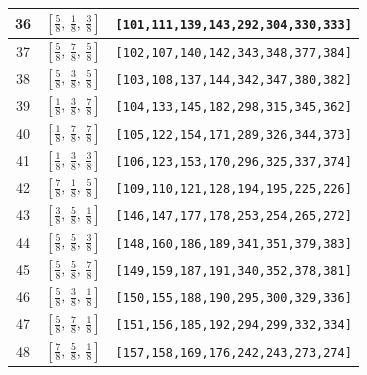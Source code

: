 \documentclass[fleqn,8pt]{jsarticle}
\begin{document}
\begin{longtable}{ccc}
36 & $\left[ \frac{5}{8},\, \frac{1}{8},\, \frac{3}{8} \right]$ & {\tt [101,111,139,143,292,304,330,333]} \\ \hline
37 & $\left[ \frac{5}{8},\, \frac{7}{8},\, \frac{5}{8} \right]$ & {\tt [102,107,140,142,343,348,377,384]} \\ \hline
38 & $\left[ \frac{5}{8},\, \frac{3}{8},\, \frac{5}{8} \right]$ & {\tt [103,108,137,144,342,347,380,382]} \\ \hline
39 & $\left[ \frac{1}{8},\, \frac{3}{8},\, \frac{7}{8} \right]$ & {\tt [104,133,145,182,298,315,345,362]} \\ \hline
40 & $\left[ \frac{1}{8},\, \frac{7}{8},\, \frac{7}{8} \right]$ & {\tt [105,122,154,171,289,326,344,373]} \\ \hline
41 & $\left[ \frac{1}{8},\, \frac{3}{8},\, \frac{3}{8} \right]$ & {\tt [106,123,153,170,296,325,337,374]} \\ \hline
42 & $\left[ \frac{7}{8},\, \frac{1}{8},\, \frac{5}{8} \right]$ & {\tt [109,110,121,128,194,195,225,226]} \\ \hline
43 & $\left[ \frac{3}{8},\, \frac{5}{8},\, \frac{1}{8} \right]$ & {\tt [146,147,177,178,253,254,265,272]} \\ \hline
44 & $\left[ \frac{5}{8},\, \frac{5}{8},\, \frac{3}{8} \right]$ & {\tt [148,160,186,189,341,351,379,383]} \\ \hline
45 & $\left[ \frac{5}{8},\, \frac{5}{8},\, \frac{7}{8} \right]$ & {\tt [149,159,187,191,340,352,378,381]} \\ \hline
46 & $\left[ \frac{5}{8},\, \frac{3}{8},\, \frac{1}{8} \right]$ & {\tt [150,155,188,190,295,300,329,336]} \\ \hline
47 & $\left[ \frac{5}{8},\, \frac{7}{8},\, \frac{1}{8} \right]$ & {\tt [151,156,185,192,294,299,332,334]} \\ \hline
48 & $\left[ \frac{7}{8},\, \frac{5}{8},\, \frac{1}{8} \right]$ & {\tt [157,158,169,176,242,243,273,274]} \\
\end{longtable}
\renewcommand{\arraystretch}{1.2}
\end{document}
